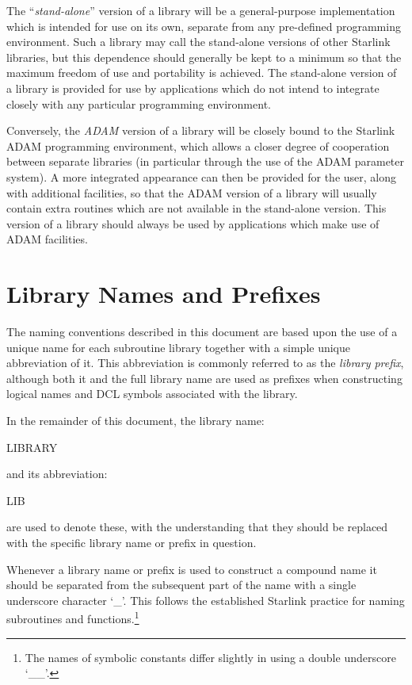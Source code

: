 \documentclass[noabs,11pt,nolof]{starlink}
\begin{document}
The ``\emph{stand-alone}'' version of a library will be a general-purpose
implementation which is intended for use on its own, separate from any
pre-defined programming environment.
Such a library may call the stand-alone versions of other Starlink
libraries, but this dependence should generally be kept to a minimum so that
the maximum freedom of use and portability is achieved.
The stand-alone version of a library is provided for use by applications
which do not intend to integrate closely with any particular programming
environment.

Conversely, the \emph{ADAM} version of a library will be closely bound to the
Starlink ADAM programming environment, which allows a closer degree of
cooperation between separate libraries (in particular through the use of the
ADAM parameter system).
A more integrated appearance can then be provided for the user, along with
additional facilities, so that the ADAM version of a library will usually
contain extra routines which are not available in the stand-alone version.
This version of a library should always be used by applications which make
use of ADAM facilities.


\section{Library Names and Prefixes}

The naming conventions described in this document are based upon the use of
a unique name for each subroutine library together with a simple unique
abbreviation of it.
This abbreviation is commonly referred to as the \emph{library prefix},
although both it and the full library name are used as prefixes when
constructing logical names and DCL symbols associated with the library.

In the remainder of this document, the library name:

\begin{terminalv}
LIBRARY
\end{terminalv}

and its abbreviation:

\begin{terminalv}
LIB
\end{terminalv}

are used to denote these, with the understanding that they should be
replaced with the specific library name or prefix in question.

Whenever a library name or prefix is used to construct a compound name it
should be separated from the subsequent part of the name with a single
underscore character `\_'.
This follows the established Starlink practice for naming subroutines and
functions.\footnote{The names of symbolic constants differ slightly in using
a double underscore `\_\_'.}
\end{document}
